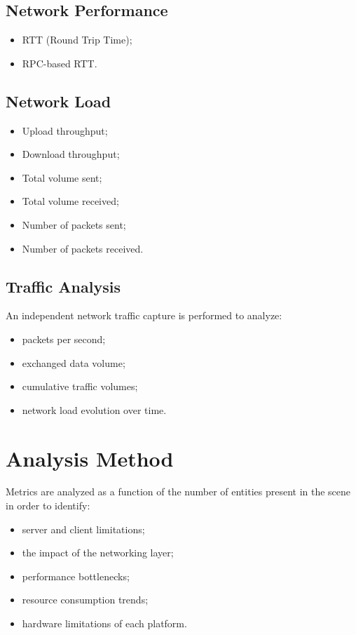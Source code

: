 \documentclass[11pt,a4paper]{article}
\begin{document}
\subsection{Network Performance}

\begin{itemize}
\item RTT (Round Trip Time);
\item RPC-based RTT.
\end{itemize}

\subsection{Network Load}

\begin{itemize}
\item Upload throughput;
\item Download throughput;
\item Total volume sent;
\item Total volume received;
\item Number of packets sent;
\item Number of packets received.
\end{itemize}

\subsection{Traffic Analysis}

An independent network traffic capture is performed to analyze:

\begin{itemize}
\item packets per second;
\item exchanged data volume;
\item cumulative traffic volumes;
\item network load evolution over time.
\end{itemize}

\section{Analysis Method}

Metrics are analyzed as a function of the number of entities present in the scene in order to identify:

\begin{itemize}
\item server and client limitations;
\item the impact of the networking layer;
\item performance bottlenecks;
\item resource consumption trends;
\item hardware limitations of each platform.
\end{itemize}
\end{document}
